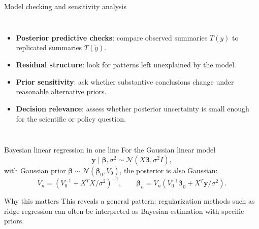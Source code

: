 \documentclass[aspectratio=169]{beamer}
\newcommand{\Normal}{\mathcal{N}}
\begin{document}
\begin{frame}{Model checking and sensitivity analysis}
\begin{columns}[T,onlytextwidth]
\begin{itemize}
  \item \textbf{Posterior predictive checks}: compare observed summaries $T(y)$ to replicated summaries $T(\tilde y)$.
  \item \textbf{Residual structure}: look for patterns left unexplained by the model.
  \item \textbf{Prior sensitivity}: ask whether substantive conclusions change under reasonable alternative priors.
  \item \textbf{Decision relevance}: assess whether posterior uncertainty is small enough for the scientific or policy question.
\end{itemize}

\centering
{}
\end{columns}
\end{frame}

\begin{frame}{Bayesian linear regression in one line}
For the Gaussian linear model
\[
  \bm y\mid\bm\beta,\sigma^2 \sim \Normal(X\bm\beta,\sigma^2 I),
\]
with Gaussian prior $\bm\beta\sim\Normal(\bm\beta_0,V_0)$, the posterior is also Gaussian:
\[
  V_n=(V_0^{-1}+X^TX/\sigma^2)^{-1},
  \qquad
  \bm\beta_n=V_n\left(V_0^{-1}\bm\beta_0+X^T\bm y/\sigma^2\right).
\]

\begin{block}{Why this matters}
This reveals a general pattern: regularization methods such as ridge regression can often be interpreted as Bayesian estimation with specific priors.
\end{block}
\end{frame}
\end{document}
